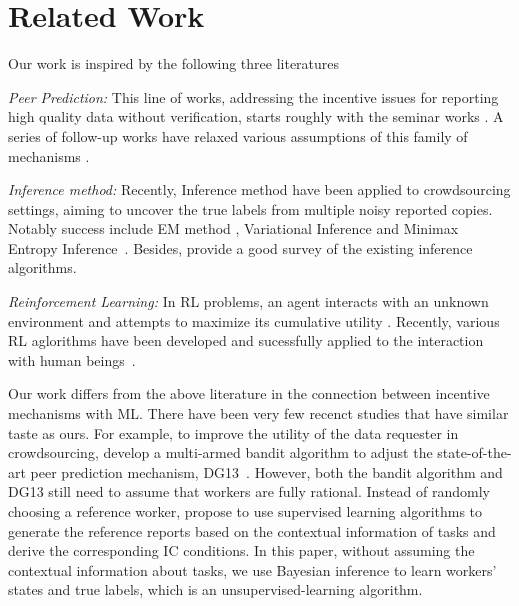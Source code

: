 \section{Related Work}
Our work is inspired by the following three literatures 

\emph{Peer Prediction:} This line of works, addressing the incentive issues for reporting high quality data without verification, starts roughly with the seminar works \cite{prelec2004bayesian,gneiting2007strictly}. A series of follow-up works have relaxed various assumptions of this family of mechanisms \cite{jurca2009mechanisms,witkowski2012peer,radanovic2013robust,dasgupta2013crowdsourced}. 

\emph{Inference method:} Recently, Inference method have been applied to crowdsourcing settings, aiming to uncover the true labels from multiple noisy reported copies. Notably success include EM method \cite{dawid1979maximum,raykar2010learning,zhang2014spectral}, Variational Inference \cite{liu2012variational,chen2015statistical} and Minimax Entropy Inference~\cite{zhou2012learning,zhou2014aggregating}. Besides, \citet{zheng2017truth} provide a good survey of the existing inference algorithms.

\emph{Reinforcement Learning:} In RL problems, an agent interacts with an unknown environment and attempts to maximize its cumulative utility \citep{Sutton98,Szepesvari10}. Recently, various RL aglorithms have been developed and sucessfully applied to the interaction with human beings~\cite{engel2005reinforcement,gasic2014gaussian}.

Our work differs from the above literature in the connection between incentive mechanisms with ML. There have been very few recenct studies that have similar taste as ours.
For example, to improve the utility of the data requester in crowdsourcing, \citet{liu2017sequential} develop a multi-armed bandit algorithm to adjust the state-of-the-art peer prediction mechanism, DG13~\cite{dasgupta2013crowdsourced}.
However, both the bandit algorithm and DG13 still need to assume that workers are fully rational.
Instead of randomly choosing a reference worker, \citet{liu2017machine} propose to use supervised learning algorithms to generate the reference reports based on the contextual information of tasks and derive the corresponding IC conditions.
In this paper, without assuming the contextual information about tasks, we use Bayesian inference to learn workers' states and true labels, which is an unsupervised-learning algorithm.

